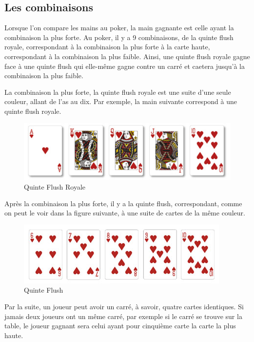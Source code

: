 \documentclass{report}
\begin{document}
\subsection{Les combinaisons}
\hspace{0.5cm}Lorsque l'on compare les mains au poker, la main gagnante est celle ayant la combinaison la plus forte. Au poker, il y a 9 combinaisons, de la quinte flush royale, correspondant à la combinaison la plus forte à la carte haute, correspondant à la combinaison la plus faible. Ainsi, une quinte flush royale gagne face à une quinte flush qui elle-même gagne contre un carré et caetera jusqu'à la combinaison la plus faible. \par


La combinaison la plus forte, la quinte flush royale est une suite d'une seule couleur, allant de l'as au dix. Par exemple, la main suivante correspond à une quinte flush royale. \par

		\begin{figure}[h]
			\begin{center}
				\includegraphics[scale=0.3]{./imagesRapport/quinteFlushRoyale.jpg}
			\end{center}
			\caption[Quinte Flush Royale]{Quinte Flush Royale}
		\end{figure}
		\medskip


Après la combinaison la plus forte, il y a la quinte flush, correspondant, comme on peut le voir dans la figure suivante, à une suite de cartes de la même couleur.\par

		\begin{figure}[h]
			\begin{center}
				\includegraphics[scale=0.4]{./imagesRapport/quinteFlush.jpg}
			\end{center}
			\caption[Quinte Flush]{Quinte Flush}
		\end{figure}
		\medskip
\newpage
Par la suite, un joueur peut avoir un carré, à savoir, quatre cartes identiques. Si jamais deux joueurs ont un même carré, par exemple si le carré se trouve sur la table, le joueur gagnant sera celui ayant pour cinquième carte la carte la plus haute.\par 
\end{document}
